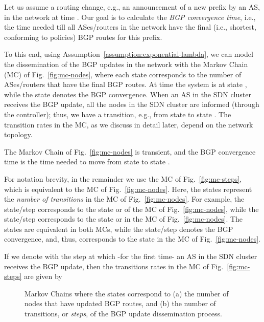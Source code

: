 Let us assume a routing change, e.g., an announcement of a new prefix by an AS, in the network at time . Our goal is to calculate the \textit{BGP convergence time}, i.e., the time needed till all ASes/routers in the network have the final (i.e., shortest, conforming to policies) BGP routes for this prefix.


To this end, using Assumption~\ref{assumption:exponential-lambda}, we can model the dissemination of the BGP updates in the network with the Markov Chain (MC) of Fig.~\ref{fig:mc-nodes}, where each state corresponds to the number of ASes/routers that have the final BGP routes. At time  the system is at state , while the state  denotes the BGP convergence. When an AS in the SDN cluster receives the BGP update, all the nodes in the SDN cluster are informed (through the controller); thus, we have a transition, e.g., from state  to state . The transition rates in the MC, as we discuss in detail later, depend on the network topology.


The Markov Chain of Fig.~\ref{fig:mc-nodes} is transient, and the BGP convergence time is the time needed to move from state  to state .

For notation brevity, in the remainder we use the MC of Fig.~\ref{fig:mc-steps}, which is equivalent to the MC of Fig.~\ref{fig:mc-nodes}. Here, the states represent the \textit{number of transitions} in the MC of Fig.~\ref{fig:mc-nodes}. For example, the state/step  corresponds to the state  or  of the MC of Fig.~\ref{fig:mc-nodes}, while the state/step  corresponds to the state  or  in the MC of Fig.~\ref{fig:mc-nodes}. The states  are equivalent in both MCs, while the state/step  denotes the BGP convergence, and, thus, corresponds to the state  in the MC of Fig.~\ref{fig:mc-nodes}. 

If we denote with  the step at which -for the first time- an AS in the SDN cluster receives the BGP update, then the transitions rates  in the MC of Fig.~\ref{fig:mc-steps} are given by



\begin{figure}
\caption{Markov Chains where the states correspond to (a) the number of nodes that have updated BGP routes, and (b) the number of transitions, or \textit{steps}, of the BGP update dissemination process.}
\label{fig:markov-chains}
\end{figure}



